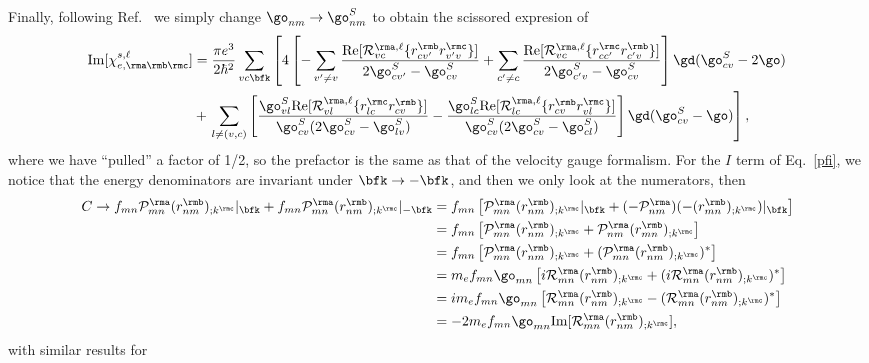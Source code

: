 Finally, following Ref.~\cite{nastos_scissors_2005,cabellos_effects_2009} we simply change
$\go_{nm}\to\go_{nm}^S$ to obtain the scissored expresion of
\begin{align}\label{imchies}
\mathrm{Im}[\chi_{e,\rma\rmb\rmc}^{s,\ell}]
&=
\frac{\pi e^3}{2\hbar^2} 
\sum_{vc\bfk}
\left[
4
\left[
-\sum_{v'\ne v}
\frac{\mathrm{Re}[{\cal R}^{\rma,\ell}_{vc}\{r^{\rmb}_{cv'}r^{\rmc}_{v'v}\}]
}{2\go^S_{cv'}-\go^S_{cv}}
+
\sum_{c'\ne c}
\frac{\mathrm{Re}[{\cal R}^{\rma,\ell}_{vc}\{r^{\rmc}_{cc'}r^{\rmb}_{c'v}\}]}
{2\go^S_{c'v}-\go^S_{cv}}
\right]
\gd(\go^S_{cv}-2\go)
\right.
\nonumber\\
&+
\left.
\sum_{l\neq(v,c)}
\left[
\frac{\go^S_{vl}\mathrm{Re}[{\cal R}^{\rma,\ell}_{vl}\{r^{\rmc}_{lc}r^{\rmb}_{cv}\}]}
{\go^S_{cv}(2\go^S_{cv}-\go^S_{lv})}
-
\frac{\go^S_{lc}\mathrm{Re}[{\cal R}^{\rma,\ell}_{lc}\{r^{\rmb}_{cv}r^{\rmc}_{vl}\}]}
{\go^S_{cv}(2\go^S_{cv}-\go^S_{cl})}
\right]
\gd(\go^S_{cv}-\go)
\right]
,
\end{align}  
where we have ``pulled'' a factor of 1/2, so the prefactor is the same
as that of the velocity gauge formalism.\cite{cabellos_effects_2009} 
For the $I$ term of Eq.~\eqref{pfi}, we notice that the energy
denominators are invariant under $\bfk\to -\bfk$, and then we only
look at the numerators, then
\begin{align}\label{ct}
C\to f_{mn}{\cal P}^{\rma}_{mn}(r^{\rmb}_{nm})_{;k^{\rmc}}|_{\bfk}
+
f_{mn}{\cal P}^{\rma}_{mn}(r^{\rmb}_{nm})_{;k^{\rmc}}|_{-\bfk}
&=
f_{mn}\left[{\cal P}^{\rma}_{mn}(r^{\rmb}_{nm})_{;k^{\rmc}}|_{\bfk}
+
(-{\cal P}^{\rma}_{nm})(-(r^{\rmb}_{mn})_{;k^{\rmc}})|_{\bfk}
\right]
\nonumber\\
&=
f_{mn}\left[{\cal P}^{\rma}_{mn}(r^{\rmb}_{nm})_{;k^{\rmc}}
+
{\cal P}^{\rma}_{nm}(r^{\rmb}_{mn})_{;k^{\rmc}}
\right]
\nonumber\\
&=
f_{mn}\left[{\cal P}^{\rma}_{mn}(r^{\rmb}_{nm})_{;k^{\rmc}}
+
({\cal P}^{\rma}_{mn}(r^{\rmb}_{nm})_{;k^{\rmc}})^*
\right]
\nonumber\\
&= 
m_ef_{mn}\go_{mn}\left[i{\cal R}^{\rma}_{mn}(r^{\rmb}_{nm})_{;k^{\rmc}}
+
(i{\cal R}^{\rma}_{mn}(r^{\rmb}_{nm})_{;k^{\rmc}})^*
\right]
\nonumber\\
&= 
im_ef_{mn}\go_{mn}\left[{\cal R}^{\rma}_{mn}(r^{\rmb}_{nm})_{;k^{\rmc}}
-
({\cal R}^{\rma}_{mn}(r^{\rmb}_{nm})_{;k^{\rmc}})^*
\right]
\nonumber\\
&= 
-2m_ef_{mn}\go_{mn}\mathrm{Im}[{\cal R}^{\rma}_{mn}(r^{\rmb}_{nm})_{;k^{\rmc}}]
,
\end{align}
with similar results for 
